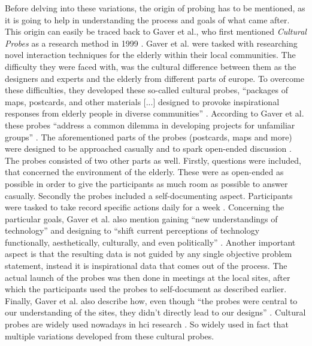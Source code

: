 Before delving into these variations, the origin of probing has to be mentioned, as it is going to help in understanding the process and goals of what came after. This origin can easily be traced back to Gaver et al., who first mentioned \textit{Cultural Probes} as a research method in 1999 \cite{gaver1999design}. Gaver et al. were tasked with researching novel interaction techniques for the elderly within their local communities. The difficulty they were faced with, was the cultural difference between them as the designers and experts and the elderly from different parts of europe. To overcome these difficulties, they developed these so-called cultural probes, \enquote{packages of maps, postcards, and other materials [...] designed to provoke inspirational responses from elderly people in diverse communities} \cite[p. 22]{gaver1999design}. According to Gaver et al. these probes \enquote{address a common dilemma in developing projects for unfamiliar groups} \cite[p. 22]{gaver1999design}. The aforementioned parts of the probes (postcards, maps and more) were designed to be approached casually and to spark open-ended discussion . The probes consisted of two other parts as well. Firstly, questions were included, that concerned the environment of the elderly. These were as open-ended as possible in order to give the participants as much room as possible to answer casually. Secondly the probes included a self-documenting aspect. Participants were tasked to take record specific actions daily for a week \cite[p. 22-26]{gaver1999design}. Concerning the particular goals, Gaver et al. also mention gaining \enquote{new understandings of technology} \cite[p. 25]{gaver1999design} and designing to \enquote{shift current perceptions of technology functionally, aesthetically, culturally, and even politically} \cite[p. 25]{gaver1999design}. Another important aspect is that the resulting data is not guided by any single objective problem statement, instead it is inspirational data that comes out of the process. The actual launch of the probes was then done in meetings at the local sites, after which the participants used the probes to self-document as described earlier. Finally, Gaver et al. also describe how, even though \enquote{the probes were central to our understanding of the sites, they didn’t directly lead to our designs} \cite[p. 29]{gaver1999design}. Cultural probes are widely used nowadays in \gls{hci} research \cite{crabtree2003designing,wyeth2006designing,kjeldskov2004using,celikoglu2017user,fisher2016adapting}. So widely used in fact that multiple variations developed from these cultural probes.

